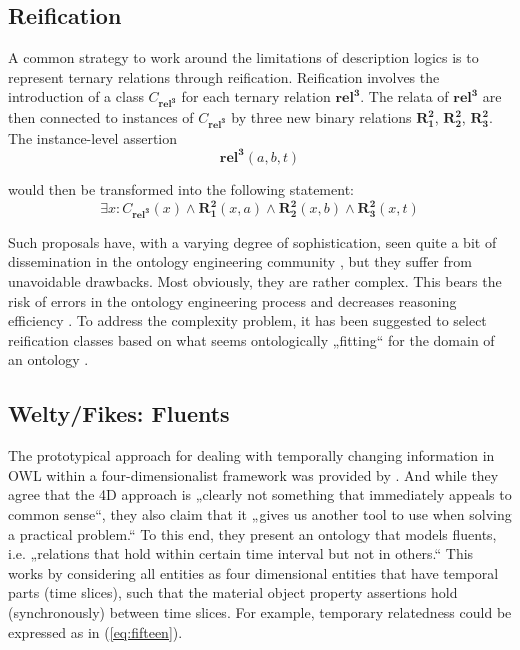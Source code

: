 \documentclass[10pt]{bmc_article}
\newcommand{\mirel}[1]{\ensuremath{\mathrm{\mathbf{#1}}}}
\newcommand{\mclass}[1]{\ensuremath{\mathit{#1}}}
\newcommand{\mrel}[2]{\mirel{#1^#2}}
\newcommand{\mrelb}[1]{\mrel{#1}{2}}
\newcommand{\mrelt}[1]{\mrel{#1}{3}}
\newenvironment{bmcformat}{\baselineskip20pt\sloppy\setboolean{publ}{false}}{\baselineskip20pt\sloppy}
\begin{document}
\begin{bmcformat}
\subsection*{Reification}

A common strategy to work around the limitations of description logics is to
represent ternary relations through reification. Reification involves the
introduction of a class $\mclass{C_\mrelt{rel}}$ for each ternary relation
\mrelt{rel}. The relata of \mrelt{rel}
are then connected to instances of $\mclass{C_\mrelt{rel}}$ by three new binary
relations \mrelb{R_1}, \mrelb{R_2},
\mrelb{R_3}. The instance-level assertion
$$
\mrelt{rel}(a,b,t)
$$

would then be transformed into the following statement:
\begin{equation}
\exists x: \mclass{C_\mrelt{rel}}(x) \wedge
\mrelb{R_1}(x,a) \wedge
\mrelb{R_2}(x,b) \wedge
\mrelb{R_3}(x,t) 
\end{equation}

Such proposals have, with a varying degree of sophistication, seen quite a bit
of dissemination in the ontology engineering community \cite{ODP:nary}, but they suffer
from unavoidable drawbacks. Most obviously, they are rather complex. This bears
the risk of errors in the ontology engineering process and decreases reasoning
efficiency \cite{Grewe:2010}. To address the complexity problem, it has been suggested to
select reification classes based on what seems ontologically „fitting“ for the
domain of an ontology \cite{Fiadeiro:2010}.

\subsection*{Welty/Fikes: Fluents}
The prototypical approach for dealing with temporally changing information in
OWL within a four-dimensionalist framework was provided by 
\cite{Welty:2006}. And while they agree that the 4D  approach is „clearly 
not something that immediately appeals to common sense“, they also claim
that it „gives us another tool to use when solving a practical problem.“ To this
end, they present an ontology that models fluents, i.e. „relations that hold
within certain time interval but not in others.“ This works by considering all
entities as four dimensional entities that have temporal parts (time slices),
such that the material object property assertions hold (synchronously) between
time slices. For example, temporary relatedness could be expressed as in
(\ref{eq:fifteen}).


\end{bmcformat}
\end{document}
